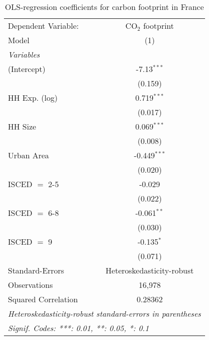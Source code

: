 
\begin{table}[htbp!]
   \centering
   \small
   \begin{adjustbox}{width = 1\textwidth, max height = 0.95\textheight, center}
      \begin{threeparttable}[b]
         \caption{\label{tab:OLS_2_FRA} OLS-regression coefficients for carbon footprint in France}
         \begin{tabular}{lc}
            \tabularnewline \midrule \midrule
            Dependent Variable: & CO$_{2}$ footprint\\  
            Model               & (1)\\  
            \midrule
            \emph{Variables}\\
            (Intercept)         & -7.13$^{***}$\\   
                                & (0.159)\\   
            HH Exp. (log)       & 0.719$^{***}$\\   
                                & (0.017)\\   
            HH Size             & 0.069$^{***}$\\   
                                & (0.008)\\   
            Urban Area          & -0.449$^{***}$\\   
                                & (0.020)\\   
            ISCED $=$ 2-5       & -0.029\\   
                                & (0.022)\\   
            ISCED $=$ 6-8       & -0.061$^{**}$\\   
                                & (0.030)\\   
            ISCED $=$ 9         & -0.135$^{*}$\\   
                                & (0.071)\\   
            \midrule 
            Standard-Errors     & Heteroskedasticity-robust \\   
            Observations        & 16,978\\  
            Squared Correlation & 0.28362\\  
            \midrule \midrule
            \multicolumn{2}{l}{\emph{Heteroskedasticity-robust standard-errors in parentheses}}\\
            \multicolumn{2}{l}{\emph{Signif. Codes: ***: 0.01, **: 0.05, *: 0.1}}\\
         \end{tabular}
         

\end{threeparttable}
\end{adjustbox}
\end{table}
